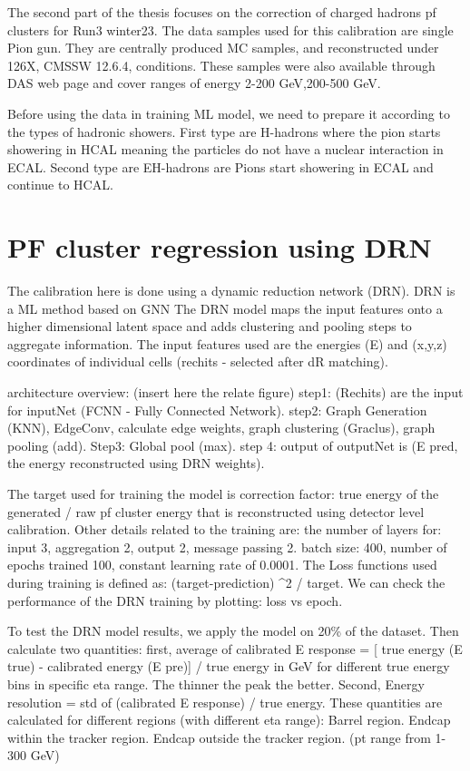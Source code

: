 The second part of the thesis focuses on the correction of charged hadrons pf clusters for Run3 winter23. The data samples used for this calibration are single Pion gun. They are centrally produced MC samples, and reconstructed under 126X, CMSSW 12.6.4, conditions. These samples were also available through DAS web page and cover ranges of energy 2-200 GeV,200-500 GeV.

Before using the data in training ML model, we need to prepare it according to the types of hadronic showers. First type are H-hadrons where the pion starts showering in HCAL meaning the particles do not have a nuclear interaction in ECAL. Second type are EH-hadrons are Pions start showering in ECAL and continue to HCAL.  

\section{PF cluster regression using DRN}

The calibration here is done using a dynamic reduction network (DRN). DRN is a ML method based on GNN %
The DRN model maps the input features onto a higher dimensional latent space and adds clustering and pooling steps to aggregate information. The input features used are the energies (E) and (x,y,z) coordinates of individual cells (rechits - selected after dR matching).

architecture overview: (insert here the relate figure) 
step1: (Rechits) are the input for inputNet (FCNN - Fully Connected Network). 
step2:  Graph Generation (KNN), EdgeConv, calculate edge weights, graph clustering (Graclus), graph pooling (add). 
Step3: Global pool (max).  
step 4: output of outputNet is (E pred, the energy reconstructed using DRN weights).

The target used for training the model is correction factor:  true energy of the generated / raw pf cluster energy that is reconstructed using detector level calibration. Other details related to the training are: the number of layers for: input 3, aggregation 2, output 2, message passing 2. batch size: 400, number of epochs trained 100, constant learning rate of 0.0001. The Loss functions used during training is defined as: (target-prediction) ^2 / target. We can check the performance of the DRN training by plotting: loss vs epoch.

To test the DRN model results, we apply the model on 20\% of the dataset. Then calculate two quantities: first, average of calibrated E response = [ true energy (E true) - calibrated energy (E pre)] / true energy in GeV for different true energy bins in specific eta range. The thinner the peak the better. 
Second, Energy resolution = std of (calibrated E response) / true energy. These quantities are calculated for different regions (with different eta range): Barrel region. Endcap within the tracker region. Endcap outside the tracker region. (pt range from 1-300 GeV)


